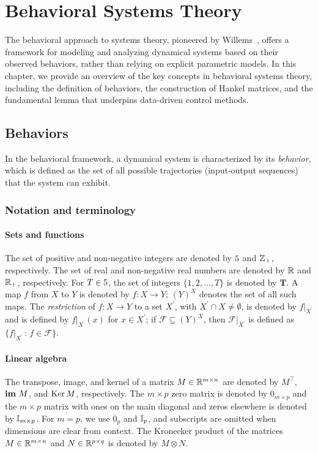 \chapter{Behavioral Systems Theory}\label{ch:Behaviors}

The behavioral approach to systems theory, pioneered by Willems~\cite{willems2007}, offers a framework for modeling and analyzing dynamical systems based on their observed behaviors, rather than relying on explicit parametric models. In this chapter, we provide an overview of the key concepts in behavioral systems theory, including the definition of behaviors, the construction of Hankel matrices, and the fundamental lemma that underpins data-driven control methods.

\section{Behaviors}
In the behavioral framework, a dynamical system is characterized by its \emph{behavior}, which is defined as the set of all possible trajectories (input-output sequences) that the system can exhibit.

\subsection{Notation and terminology}

\subsubsection{Sets and functions}
The set of positive and non-negative integers are denoted by $5$ and $\mathbb{Z}_+$, respectively. The set of real and non-negative real numbers are denoted by $\mathbb{R}$ and $\mathbb{R}_+$, respectively.  
For ${T\in5}$, the set of integers $\{1, 2, \dots , T\}$ is denoted by $\mathbf{T}$.  A map $f$ from $X$ to $Y$ is denoted by ${f:X \to Y}$; $(Y)^{X}$ denotes the set of all such maps. The \textit{restriction} of ${f:X \to Y}$ to a set ${X^{\prime}}$, with ${X^{\prime} \cap X \neq \emptyset}$, is denoted by $f|_{X^{\prime}}$ and is defined by $f|_{X^{\prime}}(x)$ for ${x \in X^{\prime}}$; if ${\mathcal{F} \subseteq (Y)^{X}}$, then $\mathcal{F}|_{X^{\prime}}$ is defined as ${\{ f|_{X^{\prime}} \, : \, f \in \mathcal{F}\}}$.

\subsubsection{Linear algebra}
The transpose, image, and kernel of a matrix ${M\in\mathbb{R}^{m\times n}}$ are denoted by $M^{\top}$, $\mathbf{im} \,\, M$, and $\operatorname{Ker} M$, respectively. The $m \times p$ zero matrix is denoted by $0_{m \times p}$ and the $m \times p$ matrix with ones on the main diagonal and zeros elsewhere is denoted by $\mathbb{I}_{m \times p}$. For $m = p$, we use $0_p$ and $\mathbb{I}_p$, and subscripts are omitted when dimensions are clear from context. The Kronecker product of the matrices $M \in \mathbb{R}^{m \times n}$ and $N \in \mathbb{R}^{p \times q}$ is denoted by $M \otimes N$. 


